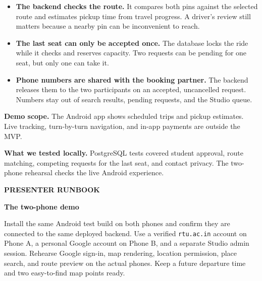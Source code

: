 \documentclass[11pt,a4paper]{article}
\newcommand{\kicker}[1]{{\small\bfseries\textcolor{Pine}{\MakeUppercase{#1}}}\par}
\newcommand{\pageheading}[2]{%
  \pdfbookmark[0]{#2}{guide-page-\thepage}%
  \kicker{#1}%
  {\fontsize{31}{35}\selectfont\bfseries\textcolor{Ink}{#2}\par}%
  \vspace{2pt}%
}
\newcommand{\subhead}[1]{\par\addvspace{8pt}{\large\bfseries\textcolor{Pine}{#1}}\par\nopagebreak[4]}
\newcommand{\rtu}{\texttt{rtu.ac.in}}
\begin{document}
\subhead{Three rules worth explaining}
\begin{itemize}
  \item \textbf{The backend checks the route.} It compares both pins against the selected route and estimates pickup time from travel progress. A driver's review still matters because a nearby pin can be inconvenient to reach.
  \item \textbf{The last seat can only be accepted once.} The database locks the ride while it checks and reserves capacity. Two requests can be pending for one seat, but only one can take it.
  \item \textbf{Phone numbers are shared with the booking partner.} The backend releases them to the two participants on an accepted, uncancelled request. Numbers stay out of search results, pending requests, and the Studio queue.
\end{itemize}

\textbf{Demo scope.} The Android app shows scheduled trips and pickup estimates. Live tracking, turn-by-turn navigation, and in-app payments are outside the MVP.

\textbf{What we tested locally.} PostgreSQL tests covered student approval, route matching, competing requests for the last seat, and contact privacy. The two-phone rehearsal checks the live Android experience.

\newpage
\pageheading{Presenter runbook}{The two-phone demo}

\subhead{Before presenting}
Install the same Android test build on both phones and confirm they are connected to the same deployed backend. Use a verified \rtu{} account on Phone A, a personal Google account on Phone B, and a separate Studio admin session. Rehearse Google sign-in, map rendering, location permission, place search, and route preview on the actual phones. Keep a future departure time and two easy-to-find map points ready.
\end{document}

